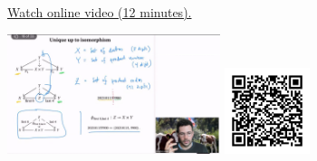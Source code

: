
\begin{minipage}{10cm}
    \href{https://act4e-spring21.netlify.app/spring2021-products:products:cat-prod:def-prof.html}{Watch online video (12 minutes).}
        
    \href{https://act4e-spring21.netlify.app/spring2021-products:products:cat-prod:def-prof.html}{\includegraphics[height=3.5cm]{spring2021-products:products:cat-prod:def-prof/thumbnails.jpg}}
    \href{https://act4e-spring21.netlify.app/spring2021-products:products:cat-prod:def-prof.html}{\includegraphics[height=2.5cm]{spring2021-products:products:cat-prod:def-prof/qrcode.png}}
\end{minipage}
